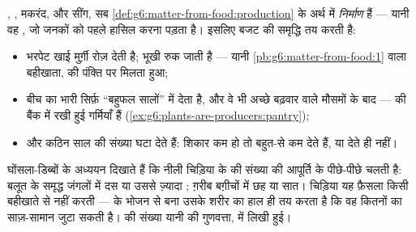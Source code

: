 \begin{proposition}[जनन का दाम पदार्थ में चुकाया जाता है]\label{prop:g8:reproduction-and-environment:cost}
, , मकरंद,  और सींग, सब
\cref{def:g6:matter-from-food:production} के अर्थ में
\emph{निर्माण} हैं --- यानी वह , जो जनकों को पहले
हासिल करना पड़ता है। इसलिए बजट  की समृद्धि तय करती है:
\begin{itemize}
  \item भरपेट खाई मुर्ग़ी रोज़  देती है; भूखी रुक जाती है ---
        यानी \cref{pb:g6:matter-from-food:1} वाला बहीखाता,  की
        पंक्ति पर मिलता हुआ;
  \item बीच का  भारी  सिर्फ़ ``बहुफल सालों'' में देता है, और वे
        भी अच्छे बढ़वार वाले मौसमों के बाद ---  की  बैंक में
        रखी हुई गर्मियाँ हैं
        (\cref{ex:g6:plants-are-producers:pantry});
  \item और कठिन साल  की संख्या घटा देते हैं: शिकार कम हो तो
        बहुत-से  कम  देते हैं, या देते ही नहीं।
\end{itemize}
\end{proposition}
\admitted

\begin{example}[चिड़िया के अंडे गिनना]\label{ex:g8:reproduction-and-environment:clutch}
घोंसला-डिब्बों के अध्ययन दिखाते हैं कि नीली चिड़िया के  की संख्या
 की आपूर्ति के पीछे-पीछे चलती है: बलूत के समृद्ध जंगलों में दस
या उससे ज़्यादा ; ग़रीब बग़ीचों में छह या सात। चिड़िया यह फ़ैसला
किसी बहीखाते से नहीं करती ---  के भोजन से बना उसके शरीर का हाल ही तय
करता है कि वह कितनों का साज़-सामान जुटा सकती है।  की संख्या यानी
 की गुणवत्ता,  में लिखी हुई।
\end{example}

